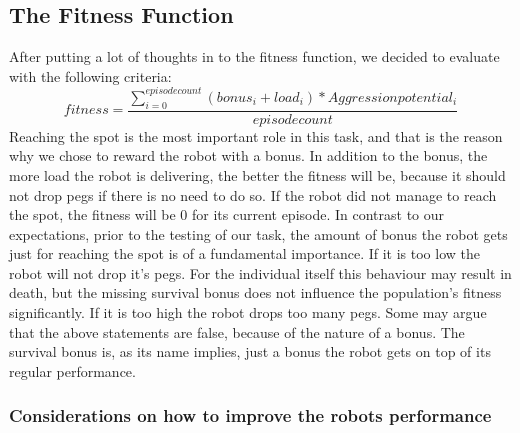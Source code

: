 \documentclass[12pt,fleqn,a4paper]{article}
\begin{document}
\subsection{The Fitness Function}
After putting a lot of thoughts in to the fitness function, we decided to evaluate with the following criteria:
\[ fitness = \frac{\sum_{i=0}^{episodecount} (bonus_i + load_i)*Aggressionpotential_i}{episodecount} \]
Reaching the spot is the most important role in this task, and that is the reason why we chose to reward the robot with a bonus. In addition to the bonus, the more load the robot is delivering, the better the fitness will be, because it should not drop pegs if there is no need to do so.
If the robot did not manage to reach the spot, the fitness will be 0 for its current episode. 
In contrast to our expectations, prior to the testing of our task, the amount of bonus the robot gets just for reaching the spot is of a fundamental importance. If it is too low the robot will not drop it's pegs. For the individual itself this behaviour may result in death, but the missing survival bonus does not influence the population's fitness significantly. If it is too high the robot drops too many pegs. Some may argue that the above statements are false, because of the nature of a bonus. 
The survival bonus is, as its name implies, just a bonus the robot gets on top of its regular performance.


\subsubsection{Considerations on how to improve the robots performance}
\end{document}
